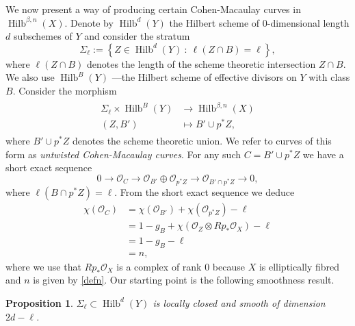 \documentclass{amsart}
\newtheorem{proposition}[theorem]{Proposition}
\theoremstyle{definition}
\renewcommand{\O}{\mathcal{O}}
\newcommand{\Hilb}{\operatorname{Hilb}}
\begin{document}
We now present a way of producing certain Cohen-Macaulay curves in  $\Hilb^{\beta,n}(X)$. Denote by $\Hilb^d(Y)$ the Hilbert scheme of 0-dimensional length $d$ subschemes of $Y$ and consider the stratum
\[
\Sigma_\ell := \left\{ Z \in \Hilb^d(Y) \ : \ \ell(Z \cap B) = \ell \right\},
\]
where $\ell(Z \cap B)$ denotes the length of the scheme theoretic intersection $Z \cap B$. We also use $\Hilb^B(Y)$ ---the Hilbert scheme of effective divisors on $Y$ with class $B$. Consider the morphism
\begin{align} 
\begin{split} \label{keymap}
\Sigma_\ell \times \Hilb^B(Y) &\rightarrow \Hilb^{\beta,n}(X) \\
(Z,B') &\mapsto B' \cup p^*Z,
\end{split}
\end{align}
where $B' \cup p^*Z$ denotes the scheme theoretic union. We refer to curves of this form as \emph{untwisted Cohen-Macaulay curves}. For any such $C = B' \cup p^*Z$ we have a short exact sequence
\[
0 \rightarrow \O_C \rightarrow \O_{B'} \oplus \O_{p^*Z} \rightarrow \O_{B' \cap p^*Z} \rightarrow 0,
\]
where $\ell(B \cap p^*Z) = \ell$. From the short exact sequence we deduce
\begin{align*}
\chi(\O_C) &= \chi(\O_{B'}) + \chi(\O_{p^*Z}) - \ell \\
&= 1-g_B + \chi(\O_Z \otimes Rp_* \O_X) - \ell \\
&= 1-g_B - \ell \\
&= n,
\end{align*}
where we use that $Rp_* \O_X$ is a complex of rank $0$ because $X$ is elliptically fibred and $n$ is given by \eqref{defn}. Our starting point is the following smoothness result.
\begin{proposition} \label{smstratum}
$\Sigma_\ell \subset \Hilb^d(Y)$ is locally closed and smooth of dimension $2d-\ell$.
\end{proposition}
\end{document}
